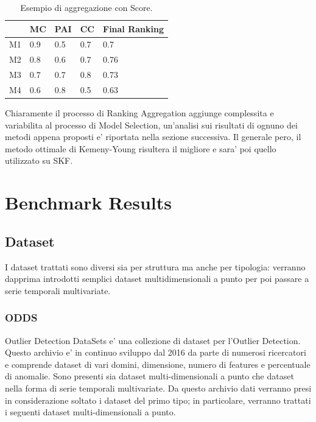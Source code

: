 \begin{table}

    \centering
\begin{tabular}{|l|l|l|l|l|}
	\hline
	   & MC  & PAI & CC  & Final Ranking \\ \hline
	M1 & 0.9 & 0.5 & 0.7 & 0.7           \\ \hline
	M2 & 0.8 & 0.6 & 0.7 & 0.76          \\ \hline
	M3 & 0.7 & 0.7 & 0.8 & 0.73          \\ \hline
	M4 & 0.6 & 0.8 & 0.5 & 0.63          \\ \hline
\end{tabular}
\caption{\label{score}Esempio di aggregazione con Score.}
\end{table}



Chiaramente il processo di Ranking Aggregation aggiunge complessita e variabilita al processo di Model Selection, un'analisi sui risultati di ognuno dei metodi appena proposti e' riportata nella sezione successiva. Il generale pero, il metodo ottimale di Kemeny-Young risultera il migliore e sara' poi quello utilizzato su SKF.


\newpage
\section{Benchmark Results}
\subsection{Dataset}
I dataset trattati sono diversi sia per struttura ma anche per tipologia: verranno dapprima introdotti semplici dataset multidimensionali a punto per poi passare a serie temporali multivariate. 

\subsubsection{ODDS}
Outlier Detection DataSets e' una collezione di dataset per l'Outlier Detection. Questo archivio e' in continuo sviluppo dal 2016 da parte di numerosi ricercatori e comprende dataset di vari domini, dimensione, numero di features e percentuale di anomalie. 
Sono presenti sia dataset multi-dimensionali a punto che dataset nella forma di serie temporali multivariate. Da questo archivio dati verranno presi in considerazione soltato i dataset del primo tipo; in particolare, verranno trattati i seguenti dataset multi-dimensionali a punto.

